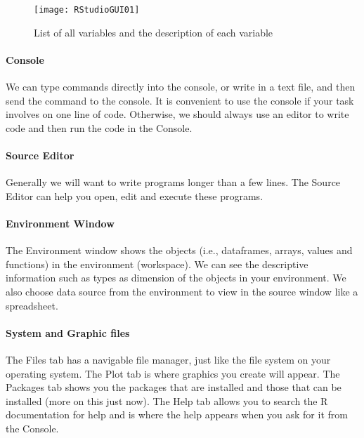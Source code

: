 \documentclass[
]{article}
\begin{document}
\begin{figure}

{\centering \texttt{[image: RStudioGUI01]} 

}

\caption{List of all variables and the description of each variable}\label{fig:unnamed-chunk-1}
\end{figure}

\hypertarget{console}{%
\paragraph{Console}\label{console}}

We can type commands directly into the console, or write in a text file,
and then send the command to the console. It is convenient to use the
console if your task involves on one line of code. Otherwise, we should
always use an editor to write code and then run the code in the Console.

\hypertarget{source-editor}{%
\paragraph{Source Editor}\label{source-editor}}

Generally we will want to write programs longer than a few lines. The
Source Editor can help you open, edit and execute these programs.

\hypertarget{environment-window}{%
\paragraph{Environment Window}\label{environment-window}}

The Environment window shows the objects (i.e., dataframes, arrays,
values and functions) in the environment (workspace). We can see the
descriptive information such as types as dimension of the objects in
your environment. We also choose data source from the environment to
view in the source window like a spreadsheet.

\hypertarget{system-and-graphic-files}{%
\paragraph{System and Graphic files}\label{system-and-graphic-files}}

The Files tab has a navigable file manager, just like the file system on
your operating system. The Plot tab is where graphics you create will
appear. The Packages tab shows you the packages that are installed and
those that can be installed (more on this just now). The Help tab allows
you to search the R documentation for help and is where the help appears
when you ask for it from the Console.
\end{document}
